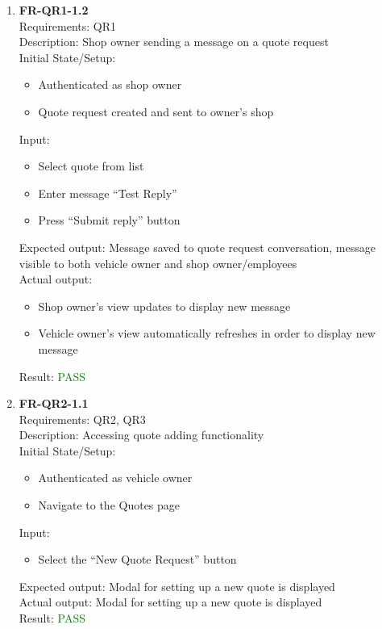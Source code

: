 \documentclass[12pt, titlepage]{article}
\newcommand{\testpass}{\textcolor{green}{PASS}}
\begin{document}
\begin{enumerate}
                \item \textbf{FR-QR1-1.2} \label{FR-QR1-1.2} \\ Requirements: QR1 \\
                    Description: Shop owner sending a message on a quote request \\
                    Initial State/Setup: \begin{itemize}
                        \item Authenticated as shop owner
                        \item Quote request created and sent to owner's shop
                    \end{itemize}
                    Input: \begin{itemize}
                        \item Select quote from list
                        \item Enter message ``Test Reply''
                        \item Press ``Submit reply'' button
                    \end{itemize}
                    Expected output: Message saved to quote request conversation, message visible to both vehicle owner and shop owner/employees \\
                    Actual output: \begin{itemize}
                        \item Shop owner's view updates to display new message
                        \item Vehicle owner's view automatically refreshes in order to display new message
                    \end{itemize}
                    Result: \testpass
                    
                \item \textbf{FR-QR2-1.1} \label{FR-QR2-1.1} \\ Requirements: QR2, QR3 \\
                    Description: Accessing quote adding functionality \\
                    Initial State/Setup: \begin{itemize}
                        \item Authenticated as vehicle owner
                        \item Navigate to the Quotes page
                    \end{itemize}
                    Input: \begin{itemize}
                        \item Select the ``New Quote Request'' button
                    \end{itemize}
                    Expected output: Modal for setting up a new quote is displayed \\
                    Actual output: Modal for setting up a new quote is displayed \\
                    Result: \testpass


\end{enumerate}
\end{document}
